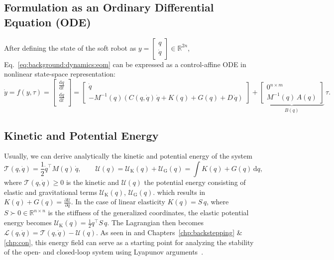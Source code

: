 \subsection{Formulation as an Ordinary Differential Equation (ODE)}
After defining the state of the soft robot as $y = \begin{bmatrix}
    q\\ \dot{q}
\end{bmatrix} \in \mathbb{R}^{2n}$, Eq.~\ref{eq:background:dynamics:eom} can be expressed as a control-affine \gls{ODE} in nonlinear state-space representation:
\begin{equation}
    \dot{y} = f(y,\tau) = \begin{bmatrix}
        \frac{\mathrm{d} q}{\mathrm{d}t}\\
        \frac{\mathrm{d} \dot{q}}{\mathrm{d}t}\\
    \end{bmatrix} = \begin{bmatrix}
        \dot{q}\\
        -M^{-1}(q) \left ( C(q,\dot{q}) \, \dot{q} + K(q) + G(q) + D \, \dot{q} \right )
    \end{bmatrix} + \underbrace{\begin{bmatrix}
        0^{n \times m}\\ M^{-1}(q) \, A(q)
    \end{bmatrix}}_{B(q)} \, \tau.
\end{equation}

\subsection{Kinetic and Potential Energy}
Usually, we can derive analytically the kinetic and potential energy of the system
\begin{equation}
    \mathcal{T}(q,\dot{q}) = \frac{1}{2} \dot{q}^\top M(q) \, \dot{q},
    \qquad
    \mathcal{U}(q) = \mathcal{U}_\mathrm{K}(q) + \mathcal{U}_\mathrm{G}(q) = \int K(q) + G(q) \, \mathrm{d}q,
\end{equation}
where $\mathcal{T}(q,\dot{q}) \geq 0$ is the kinetic and $\mathcal{U}(q)$ the potential energy consisting of elastic and gravitational terms $\mathcal{U}_\mathrm{K}(q)$, $\mathcal{U}_\mathrm{G}(q)$.
which results in $K(q) + G(q) = \frac{\partial \mathcal{U}}{\partial q}$. 
In the case of linear elasticity $K(q) = S \, q$, where $S \succ 0 \in \mathbb{R}^{n \times n}$ is the stiffness of the generalized coordinates, the elastic potential energy becomes $\mathcal{U}_\mathrm{K}(q) = \frac{1}{2} q^\top S \, q$.
The Lagrangian then becomes $\mathcal{L}(q,\dot{q}) = \mathcal{T}(q,\dot{q}) - \mathcal{U}(q)$.
% 
As seen in \citet{della2020model, della2023model} and Chapters~\ref{chp:backstepping} \& \ref{chp:con}, this energy field can serve as a starting point for analyzing the stability of the open- and closed-loop system using Lyapunov arguments~\citep{khalil2002nonlinear}.

